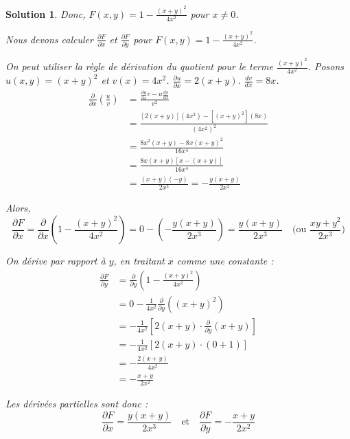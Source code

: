 \documentclass[10pt]{article}
\theoremstyle{frenchstyle}
\newtheorem{solution}{Solution}
\begin{document}
\begin{solution}
    Donc, $F(x,y) = 1 - \frac{(x+y)^2}{4x^2}$ pour $x \neq 0$.

    Nous devons calculer $\frac{\partial F}{\partial x}$ et $\frac{\partial F}{\partial y}$ pour $F(x,y) = 1 - \frac{(x+y)^2}{4x^2}$.

    On peut utiliser la règle de dérivation du quotient pour le terme $\frac{(x+y)^2}{4x^2}$. Posons $u(x,y) = (x+y)^2$ et $v(x) = 4x^2$.
    $\frac{\partial u}{\partial x} = 2(x+y)$.
    $\frac{dv}{dx} = 8x$.
    \begin{align*}
        \frac{\partial}{\partial x} \left( \frac{u}{v} \right) & = \frac{\frac{\partial u}{\partial x} v - u \frac{dv}{dx}}{v^2} \\
                                                             & = \frac{[2(x+y)](4x^2) - [(x+y)^2](8x)}{(4x^2)^2} \\
                                                             & = \frac{8x^2(x+y) - 8x(x+y)^2}{16x^4} \\
                                                             & = \frac{8x(x+y) [x - (x+y)]}{16x^4} \\
                                                             & = \frac{(x+y)(-y)}{2x^3} = -\frac{y(x+y)}{2x^3}
    \end{align*}

    Alors,
    \[
        \frac{\partial F}{\partial x} = \frac{\partial}{\partial x} \left( 1 - \frac{(x+y)^2}{4x^2} \right) = 0 - \left( -\frac{y(x+y)}{2x^3} \right) = \frac{y(x+y)}{2x^3} \quad \text{(ou } \frac{xy+y^2}{2x^3} \text{)}
    \]

    On dérive par rapport à $y$, en traitant $x$ comme une constante :
    \begin{align*}
        \frac{\partial F}{\partial y} & = \frac{\partial}{\partial y} \left( 1 - \frac{(x+y)^2}{4x^2} \right) \\
                                      & = 0 - \frac{1}{4x^2} \frac{\partial}{\partial y}((x+y)^2) \\
                                      & = -\frac{1}{4x^2} [2(x+y) \cdot \frac{\partial}{\partial y}(x+y)] \\
                                      & = -\frac{1}{4x^2} [2(x+y) \cdot (0+1)] \\
                                      & = -\frac{2(x+y)}{4x^2} \\
                                      & = -\frac{x+y}{2x^2}
    \end{align*}
	
    Les dérivées partielles sont donc :
    \[
        \frac{\partial F}{\partial x} = \frac{y(x+y)}{2x^3} \quad \text{et} \quad \frac{\partial F}{\partial y} = -\frac{x+y}{2x^2}
    \]
\end{solution}
\end{document}
